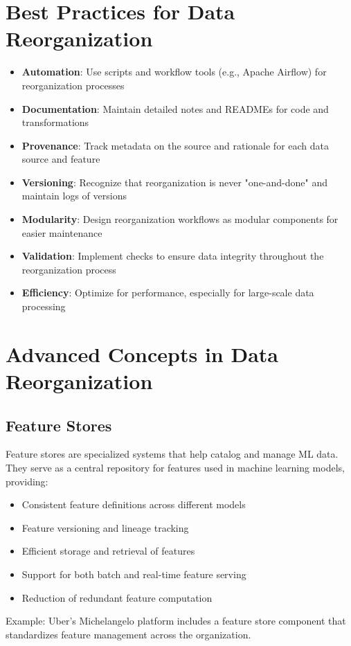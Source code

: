 \documentclass[12pt]{article}
\begin{document}
\section{Best Practices for Data Reorganization}

\begin{tcolorbox}[colback=green!5!white,colframe=green!75!black,title={Best Practices}]
\begin{itemize}
    \item \textbf{Automation}: Use scripts and workflow tools (e.g., Apache Airflow) for reorganization processes
    \item \textbf{Documentation}: Maintain detailed notes and READMEs for code and transformations
    \item \textbf{Provenance}: Track metadata on the source and rationale for each data source and feature
    \item \textbf{Versioning}: Recognize that reorganization is never "one-and-done" and maintain logs of versions
    \item \textbf{Modularity}: Design reorganization workflows as modular components for easier maintenance
    \item \textbf{Validation}: Implement checks to ensure data integrity throughout the reorganization process
    \item \textbf{Efficiency}: Optimize for performance, especially for large-scale data processing
\end{itemize}
\end{tcolorbox}

\section{Advanced Concepts in Data Reorganization}

\subsection{Feature Stores}
\begin{tcolorbox}[colback=yellow!5!white,colframe=yellow!75!black,title={Feature Stores}]
Feature stores are specialized systems that help catalog and manage ML data. They serve as a central repository for features used in machine learning models, providing:

\begin{itemize}
    \item Consistent feature definitions across different models
    \item Feature versioning and lineage tracking
    \item Efficient storage and retrieval of features
    \item Support for both batch and real-time feature serving
    \item Reduction of redundant feature computation
\end{itemize}

Example: Uber's Michelangelo platform includes a feature store component that standardizes feature management across the organization.
\end{tcolorbox}
\end{document}
